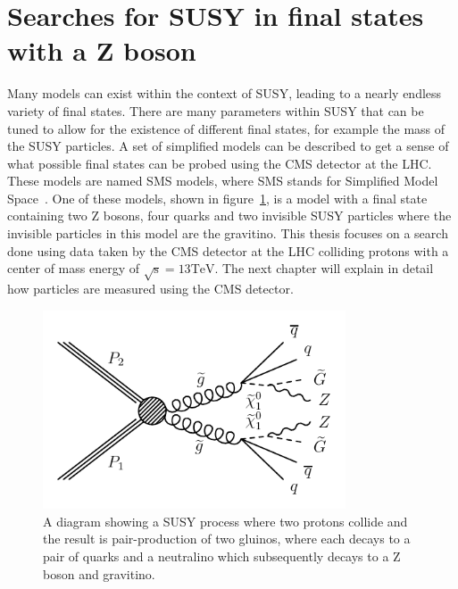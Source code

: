 \section{Searches for SUSY in final states with a Z boson}
\label{sec:signalmodel}
Many models can exist within the context of SUSY, leading to a nearly endless variety of final states.
There are many parameters within SUSY that can be tuned to allow for the existence of different final states, for example the mass of the SUSY particles.
A set of simplified models can be described to get a sense of what possible final states can be probed using the CMS detector at the LHC.
These models are named SMS models, where SMS stands for Simplified Model Space~\cite{sms}.
One of these models, shown in figure~\ref{fig:SMS_T5ZZgmsb}, is a model with a final state containing two Z bosons,
four quarks and two invisible SUSY particles where the invisible particles in this model are the gravitino.
This thesis focuses on a search done using data taken by the CMS detector at the LHC colliding protons with a center of mass energy of $\mathrm{\sqrt{s}=13 TeV}$.
The next chapter will explain in detail how particles are measured using the CMS detector.

\begin{figure}[!htb]
  \begin{center}
    \includegraphics[width=0.8\textwidth]{intro/figs/Feynman_graph_T5ZZgmsb.pdf}
    \caption{
      \label{fig:SMS_T5ZZgmsb}
      A diagram showing a SUSY process where two protons collide and the result is pair-production of two gluinos,
      where each decays to a pair of quarks and a neutralino which subsequently decays to a Z boson and gravitino.
    }
  \end{center}
\end{figure}
